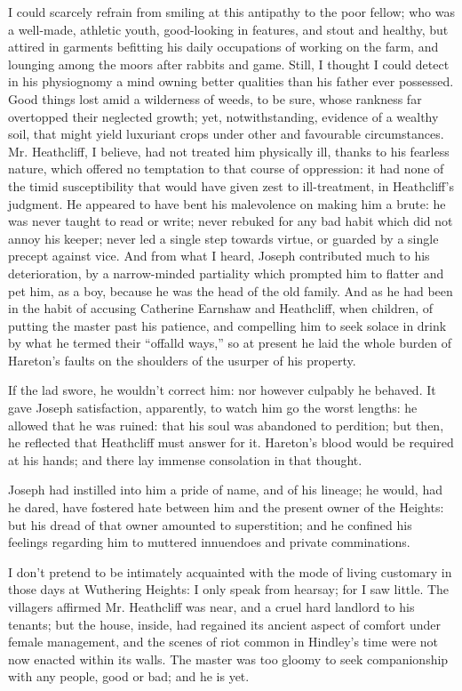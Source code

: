 \par I could scarcely refrain from smiling at this antipathy to the poor fellow; who was a well-made, athletic youth, good-looking in features, and stout and healthy, but attired in garments befitting his daily occupations of working on the farm, and lounging among the moors after rabbits and game. Still, I thought I could detect in his physiognomy a mind owning better qualities than his father ever possessed. Good things lost amid a wilderness of weeds, to be sure, whose rankness far overtopped their neglected growth; yet, notwithstanding, evidence of a wealthy soil, that might yield luxuriant crops under other and favourable circumstances. Mr. Heathcliff, I believe, had not treated him physically ill, thanks to his fearless nature, which offered no temptation to that course of oppression: it had none of the timid susceptibility that would have given zest to ill-treatment, in Heathcliff's judgment. He appeared to have bent his malevolence on making him a brute: he was never taught to read or write; never rebuked for any bad habit which did not annoy his keeper; never led a single step towards virtue, or guarded by a single precept against vice. And from what I heard, Joseph contributed much to his deterioration, by a narrow-minded partiality which prompted him to flatter and pet him, as a boy, because he was the head of the old family. And as he had been in the habit of accusing Catherine Earnshaw and Heathcliff, when children, of putting the master past his patience, and compelling him to seek solace in drink by what he termed their “offalld ways,” so at present he laid the whole burden of Hareton's faults on the shoulders of the usurper of his property.
\par If the lad swore, he wouldn't correct him: nor however culpably he behaved. It gave Joseph satisfaction, apparently, to watch him go the worst lengths: he allowed that he was ruined: that his soul was abandoned to perdition; but then, he reflected that Heathcliff must answer for it. Hareton's blood would be required at his hands; and there lay immense consolation in that thought.
\par Joseph had instilled into him a pride of name, and of his lineage; he would, had he dared, have fostered hate between him and the present owner of the Heights: but his dread of that owner amounted to superstition; and he confined his feelings regarding him to muttered innuendoes and private comminations.
\par I don't pretend to be intimately acquainted with the mode of living customary in those days at Wuthering Heights: I only speak from hearsay; for I saw little. The villagers affirmed Mr. Heathcliff was near, and a cruel hard landlord to his tenants; but the house, inside, had regained its ancient aspect of comfort under female management, and the scenes of riot common in Hindley's time were not now enacted within its walls. The master was too gloomy to seek companionship with any people, good or bad; and he is yet.
